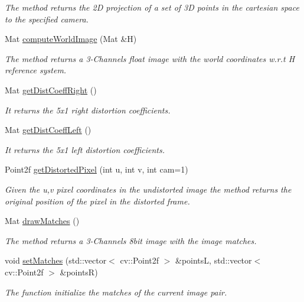 \begin{DoxyCompactItemize}
\begin{DoxyCompactList}\small\item\em The method returns the 2\+D projection of a set of 3\+D points in the cartesian space to the specified camera. \end{DoxyCompactList}\item 
Mat \hyperlink{classStereoCamera_a52ef2f3401488e5c4fa6badd1336f96d}{compute\+World\+Image} (Mat \&H)
\begin{DoxyCompactList}\small\item\em The method returns a 3-\/\+Channels float image with the world coordinates w.\+r.\+t H reference system. \end{DoxyCompactList}\item 
Mat \hyperlink{classStereoCamera_a3edeb24b68ee4266f89982533ad1e9bf}{get\+Dist\+Coeff\+Right} ()
\begin{DoxyCompactList}\small\item\em It returns the 5x1 right distortion coefficients. \end{DoxyCompactList}\item 
Mat \hyperlink{classStereoCamera_a4830201154ab288bd93f6cceb2c2daf5}{get\+Dist\+Coeff\+Left} ()
\begin{DoxyCompactList}\small\item\em It returns the 5x1 left distortion coefficients. \end{DoxyCompactList}\item 
Point2f \hyperlink{classStereoCamera_af64550bb8a7a665930dee5eea87b7e47}{get\+Distorted\+Pixel} (int u, int v, int cam=1)
\begin{DoxyCompactList}\small\item\em Given the u,v pixel coordinates in the undistorted image the method returns the original position of the pixel in the distorted frame. \end{DoxyCompactList}\item 
Mat \hyperlink{classStereoCamera_a6580ff03c7cec5c385ec717f9c018e21}{draw\+Matches} ()
\begin{DoxyCompactList}\small\item\em The method returns a 3-\/\+Channels 8bit image with the image matches. \end{DoxyCompactList}\item 
void \hyperlink{classStereoCamera_ae683fafa11ea73e4b4c278402be259b6}{set\+Matches} (std\+::vector$<$ cv\+::\+Point2f $>$ \&points\+L, std\+::vector$<$ cv\+::\+Point2f $>$ \&points\+R)
\begin{DoxyCompactList}\small\item\em The function initialize the matches of the current image pair. \end{DoxyCompactList}\item 

\end{DoxyCompactItemize}
